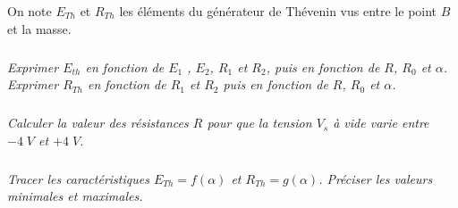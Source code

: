 \documentclass[10pt]{article}
\newif\ifprof
\begin{document}
On note $E_{Th}$ et $R_{Th}$ les éléments du générateur de Thévenin vus entre le point $B$ et la masse. 

\subparagraph{}
\textit{Exprimer $E_{th}$ en fonction de $E_1$ , $E_2$, $R_1$ et $R_2$, puis en fonction de $R$, $R_0$ et $\alpha$. Exprimer $R_{Th}$ en fonction de $R_1$ et $R_2$ puis en fonction de $R$, $R_0$ et $\alpha$.}
\ifprof
\begin{corrige}
\end{corrige}
\else
\fi

\subparagraph{}
\textit{Calculer la valeur des résistances $R$ pour que la tension $V_s$ à vide varie entre $-4\; V$ et $+4\; V$.}
\ifprof
\begin{corrige}
\end{corrige}
\else
\fi

\subparagraph{}
\textit{Tracer les caractéristiques $E_{Th} = f(\alpha)$ et $R_{Th}=g(\alpha)$. Préciser les valeurs minimales et maximales.}
\ifprof
\begin{corrige}
\end{corrige}
\else
\fi
\end{document}
